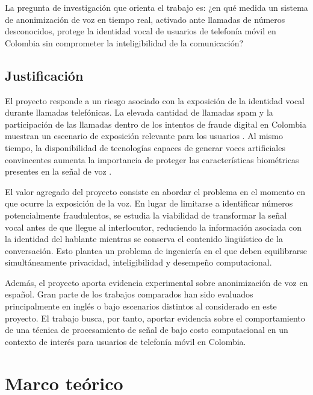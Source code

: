 \documentclass[10pt,twocolumn]{article}
\begin{document}
La pregunta de investigación que orienta el trabajo es: ¿en qué medida un
sistema de anonimización de voz en tiempo real, activado ante llamadas de
números desconocidos, protege la identidad vocal de usuarios de telefonía móvil
en Colombia sin comprometer la inteligibilidad de la comunicación?

\subsection{Justificación}

El proyecto responde a un riesgo asociado con la exposición de la identidad
vocal durante llamadas telefónicas. La elevada cantidad de llamadas spam y la
participación de las llamadas dentro de los intentos de fraude digital en
Colombia muestran un escenario de exposición relevante para los usuarios
\cite{acis2026,transunion2025}. Al mismo tiempo, la disponibilidad de
tecnologías capaces de generar voces artificiales convincentes aumenta la
importancia de proteger las características biométricas presentes en la señal
de voz \cite{barrington2025,groupib2025}.

El valor agregado del proyecto consiste en abordar el problema en el momento en
que ocurre la exposición de la voz. En lugar de limitarse a identificar números
potencialmente fraudulentos, se estudia la viabilidad de transformar la señal
vocal antes de que llegue al interlocutor, reduciendo la información asociada
con la identidad del hablante mientras se conserva el contenido lingüístico de
la conversación. Esto plantea un problema de ingeniería en el que deben
equilibrarse simultáneamente privacidad, inteligibilidad y desempeño
computacional.

Además, el proyecto aporta evidencia experimental sobre anonimización de voz en
español. Gran parte de los trabajos comparados han sido evaluados principalmente
en inglés o bajo escenarios distintos al considerado en este proyecto. El
trabajo busca, por tanto, aportar evidencia sobre el comportamiento de una
técnica de procesamiento de señal de bajo costo computacional en un contexto de
interés para usuarios de telefonía móvil en Colombia.

\section{Marco teórico}
\end{document}

